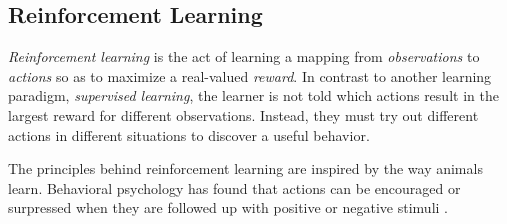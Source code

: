 \subsection{Reinforcement Learning}
\textit{Reinforcement learning} is the act of learning a mapping from \textit{observations} to \textit{actions} so as to maximize a real-valued \textit{reward}. In contrast to another learning paradigm, \textit{supervised learning}, the learner is not told which actions result in the largest reward for different observations. Instead, they must try out different actions in different situations to discover a useful behavior. \cite{bible}

The principles behind reinforcement learning are inspired by the way animals learn. Behavioral psychology has found that actions can be encouraged or surpressed when they are followed up with positive or negative stimuli \cite{thorndike}.





